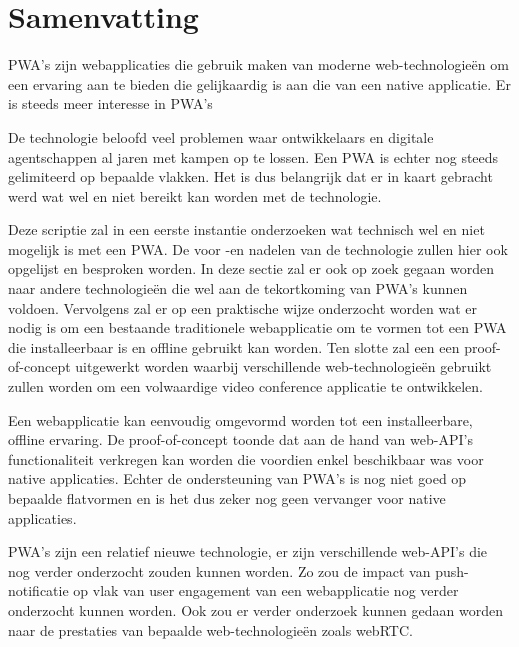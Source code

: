 





\chapter*{Samenvatting}

PWA's zijn webapplicaties die gebruik maken van moderne web-technologieën om een ervaring aan te bieden die gelijkaardig is aan die van een native applicatie. Er is steeds meer interesse in PWA's \autocite{googleTrends2020}

De technologie beloofd veel problemen waar ontwikkelaars en digitale agentschappen al jaren met kampen op te lossen.  Een PWA is echter nog steeds gelimiteerd op bepaalde vlakken. 
Het is dus belangrijk dat er in kaart gebracht werd wat wel en niet bereikt kan worden met de technologie.

Deze scriptie zal in een eerste instantie onderzoeken wat technisch wel en niet mogelijk is met een PWA. De voor -en nadelen van de technologie zullen hier ook opgelijst en besproken worden.
In deze sectie zal er ook op zoek gegaan worden naar andere technologieën die wel aan de tekortkoming van PWA's kunnen voldoen.
Vervolgens zal er op een praktische wijze onderzocht worden wat er nodig is om een bestaande traditionele webapplicatie om te vormen tot een PWA die installeerbaar is en offline gebruikt kan worden.
Ten slotte zal een een proof-of-concept uitgewerkt worden waarbij verschillende web-technologieën gebruikt zullen worden om een volwaardige video conference applicatie te ontwikkelen. 

Een webapplicatie kan eenvoudig omgevormd worden tot een installeerbare, offline ervaring. De proof-of-concept toonde dat aan de hand van web-API's functionaliteit verkregen kan worden die voordien enkel beschikbaar was voor native applicaties.
Echter de ondersteuning van PWA's is nog niet goed op bepaalde flatvormen en is het dus zeker nog geen vervanger voor native applicaties.

PWA's zijn een relatief nieuwe technologie, er zijn verschillende web-API's die nog verder onderzocht zouden kunnen worden. Zo zou de impact van push-notificatie op vlak van user engagement van een webapplicatie nog verder onderzocht kunnen worden. Ook zou er verder onderzoek kunnen gedaan worden naar de prestaties van bepaalde web-technologieën zoals webRTC.